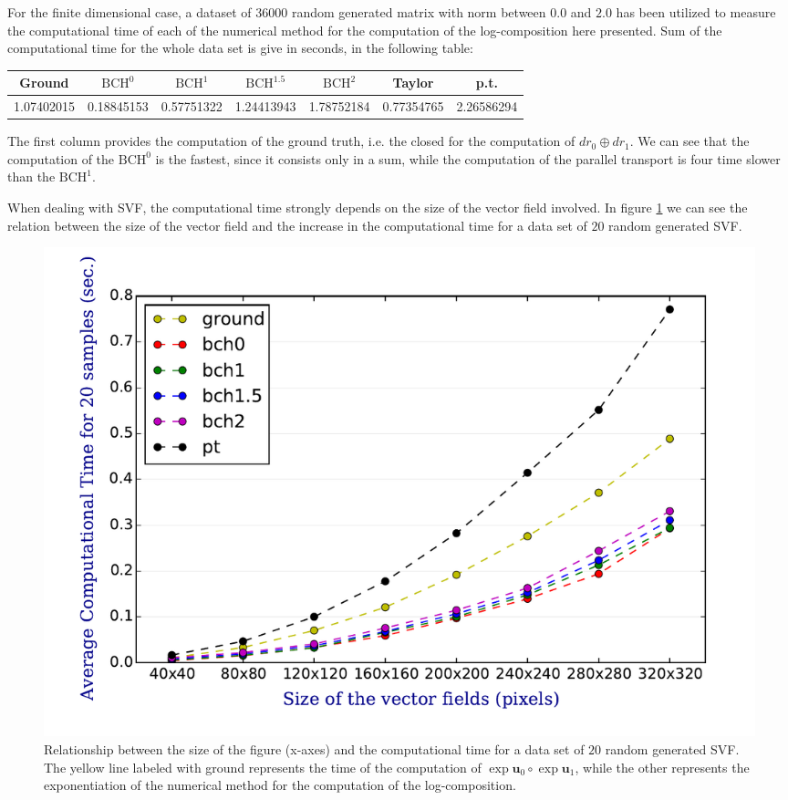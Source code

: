 For the finite dimensional case, a dataset of $36000$ random generated matrix with norm between $0.0$ and $2.0$ has been utilized to measure the computational time of each of the numerical method for the computation of the log-composition here presented. Sum of the computational time for the whole data set is give in seconds, in the following table:\\

\hspace{-1cm}
\begin{tabular}{ c | c | c | c | c | c | c }
Ground & $\text{BCH}^0$ & $\text{BCH}^1$ & $\text{BCH}^{1.5}$ & $\text{BCH}^2$ & Taylor & p.t. \\
\hline
1.07402015 & 0.18845153 & 0.57751322 & 1.24413943 & 1.78752184 & 0.77354765 &
2.26586294 
\end{tabular}
\vspace{0.5cm}

The first column provides the computation of the ground truth, i.e. the closed for the computation of $dr_0 \oplus dr_{1}$. We can see that the computation of the $\text{BCH}^0$ is the fastest, since it consists only in a sum, while the computation of the parallel transport is four time slower than the $\text{BCH}^1$.

When dealing with SVF, the computational time strongly depends on the size of the vector field involved. In figure \ref{fig:svf_computational_time} we can see the relation between the size of the vector field and the increase in the computational time for a data set of $20$ random generated SVF.

\begin{figure}[!ht]
	\includegraphics[scale=0.7]{figures/svf_computational_time.pdf}
	\caption{Relationship between the size of the figure (x-axes) and the computational time for a data set of $20$ random generated SVF. The yellow line labeled with ground represents the time of the computation of $\exp{\mathbf{u}_0}\circ \exp{\mathbf{u}_1}$, while the other represents the exponentiation of the numerical method for the computation of the log-composition.}
	\label{fig:svf_computational_time}
\end{figure}


